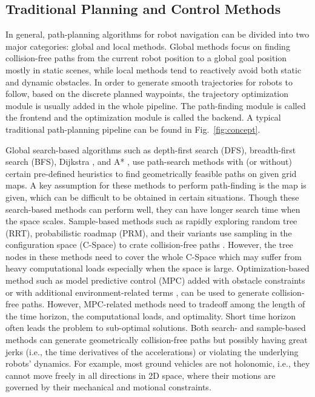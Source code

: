 \documentclass[letterpaper,journal,twoside]{IEEEtran}
\begin{document}
\subsection{Traditional Planning and Control Methods}



In general, path-planning algorithms for robot navigation can be divided into two major categories: global and local methods.  
Global methods focus on finding collision-free paths from the current robot position to a global goal position mostly in static scenes, while local methods tend to reactively avoid both static and dynamic obstacles. 
In order to generate smooth trajectories for robots to follow, based on the discrete planned waypoints, the trajectory optimization module is usually added in the whole pipeline. 
The path-finding module is called the frontend and the optimization module is called the backend. 
A typical traditional path-planning pipeline can be found in Fig.~\ref{fig:concept}.

% 
Global search-based algorithms such as depth-first search (DFS), breadth-first search (BFS), Dijkstra \cite{wang2011application}, and A* \cite{hart1968formal}, use path-search methods with (or without) certain pre-defined heuristics to find geometrically feasible paths on given grid maps. 
A key assumption for these methods to perform path-finding is the map is given, which can be difficult to be obtained in certain situations. 
Though these search-based methods can perform well, they can have longer search time when the space scales.
Sample-based methods such as rapidly exploring random tree (RRT), probabilistic roadmap (PRM), and their variants use sampling in the configuration space (C-Space) to crate collision-free paths \cite{lavalle2001rapidly,karaman2011sampling,kavraki1996probabilistic}. 
% 
% 
However, the tree nodes in these methods need to cover the whole C-Space which may suffer from heavy computational loads especially when the space is large.  
Optimization-based method such as model predictive control (MPC) added with obstacle constraints or with additional environment-related terms \cite{park2009obstacle}, \cite{ji2016path}  can be used to generate collision-free paths. 
However, MPC-related methods need to tradeoff among the length of the time horizon, the computational loads, and optimality. Short time horizon often leads the problem to sub-optimal solutions.
Both search- and sample-based methods can generate geometrically collision-free paths but possibly having great jerks (i.e., the time derivatives of the accelerations) or violating the underlying robots' dynamics.
For example, most ground vehicles are not holonomic, i.e., they cannot move freely in all directions in 2D space, where their motions are governed by their mechanical and motional constraints.
\end{document}

